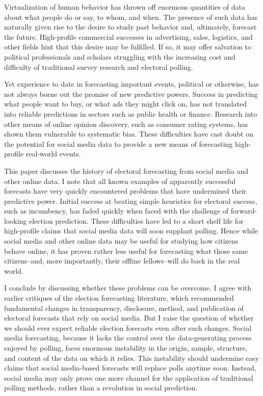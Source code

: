 \documentclass{article}
\begin{document}
Virtualization of human behavior has thrown off enormous quantities of
data about what people do or say, to whom, and when. The presence of
such data has naturally given rise to the desire to study past behavior and,
ultimately, forecast the future. High-profile commercial successes in
advertising, sales, logistics, and other fields hint that this desire
may be fulfilled. If so, it may offer salvation to political
professionals and scholars struggling with the increasing cost and
difficulty of traditional survey research and electoral polling.

Yet experience to date in forecasting important events, political or
otherwise, has not always borne out the promise of new predictive
powers. Success in predicting what people want to buy, or what ads
they might click on, has not translated into reliable predictions in
sectors such as public health or finance. Research into other means of
online opinion discovery, such as consumer rating systems, has shown
them vulnerable to systematic bias. These difficulties have cast doubt
on the potential for social media data to provide a new means of
forecasting high-profile real-world events. 

This paper discusses the history of electoral forecasting from social
media and other online data. I note that all
known examples of apparently successful forecasts have very quickly
encountered problems that have undermined their predictive
power. Initial success at beating simple heuristics for electoral
success, such as incumbency, has faded quickly when faced with the
challenge of forward-looking election prediction. These difficulties have led to a short
shelf life for  high-profile claims that social media data
will soon supplant polling. Hence while
social media and other online data may be useful for studying how
citizens behave online, it has proven rather less useful for
forecasting what those same citizens--and, more importantly, their
offline fellows--will do back in the real world.

I conclude by discussing whether these problems can be overcome. I
agree with earlier critiques of the election forecasting literature, which
recommended fundamental changes in transparency, disclosure, method, and
publication of electoral forecasts that rely on social media. But I
raise the question of whether we should ever expect reliable election
forecasts even after such changes. Social media forecasting, because
it lacks the control over the data-generating process enjoyed by
polling, faces enormous instability in the origin, sample, structure,
and content of the data on which it relies. This instability should
undermine easy claims that social media-based forecasts will replace
polls anytime soon. Instead, social media may only prove one more
channel for the application of traditional polling methods, rather
than a revolution in social prediction. 
\end{document}

